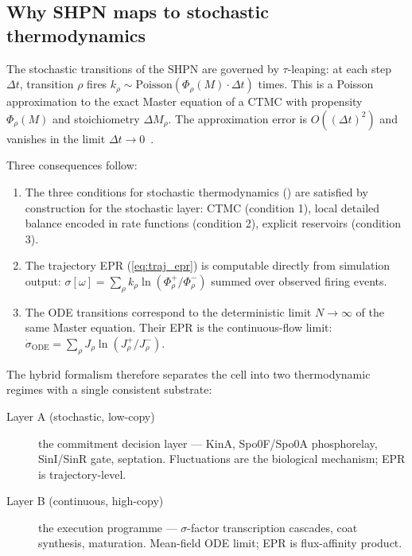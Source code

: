 \documentclass[11pt,a4paper]{article}
\newcommand{\EPR}{\dot{\sigma}}
\newcommand{\TrajEPR}[1]{\sigma[#1]}
\begin{document}
\subsection{Why SHPN maps to stochastic thermodynamics}
\label{sec:shpn_nesm_map}

The stochastic transitions of the SHPN are governed by $\tau$-leaping:
at each step $\Delta t$, transition $\rho$ fires $k_\rho \sim
\mathrm{Poisson}(\Phi_\rho(M) \cdot \Delta t)$ times.
This is a Poisson approximation to the exact Master equation of a CTMC
with propensity $\Phi_\rho(M)$ and stoichiometry $\Delta M_\rho$.
The approximation error is $O((\Delta t)^2)$ and vanishes in the limit
$\Delta t \to 0$~\cite{Gillespie2001}.

Three consequences follow:
\begin{enumerate}
  \item The three conditions for stochastic thermodynamics
    () are satisfied by construction for the stochastic
    layer: CTMC (condition 1), local detailed balance encoded in rate
    functions (condition 2), explicit reservoirs (condition 3).
  \item The trajectory EPR (\cref{eq:traj_epr}) is computable directly
    from simulation output: $\TrajEPR{\omega} = \sum_\rho k_\rho \ln
    (\Phi_\rho^+ / \Phi_\rho^-)$ summed over observed firing events.
  \item The ODE transitions correspond to the deterministic limit
    $N \to \infty$ of the same Master equation.
    Their EPR is the continuous-flow limit:
    $\EPR_{\mathrm{ODE}} = \sum_\rho J_\rho \ln(J_\rho^+/J_\rho^-)$.
\end{enumerate}

The hybrid formalism therefore separates the cell into two thermodynamic
regimes with a single consistent substrate:
\begin{description}
  \item[Layer A (stochastic, low-copy)] the commitment decision layer
    --- KinA, Spo0F/Spo0A phosphorelay, SinI/SinR gate, septation.
    Fluctuations are the biological mechanism; EPR is trajectory-level.
  \item[Layer B (continuous, high-copy)] the execution programme ---
    $\sigma$-factor transcription cascades, coat synthesis, maturation.
    Mean-field ODE limit; EPR is flux-affinity product.
\end{description}
\end{document}
